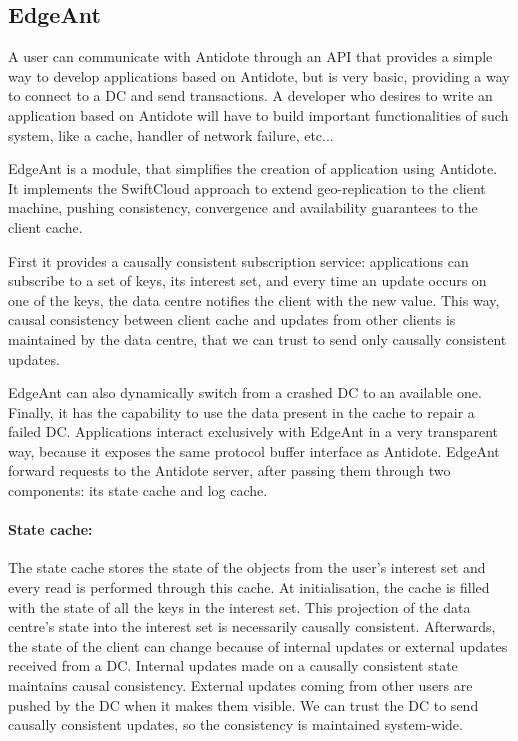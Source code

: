 \documentclass[11pt]{article}
\begin{document}
\subsection{EdgeAnt}

A user can communicate with Antidote through an API that provides a simple way
to develop applications based on Antidote, but is very basic, providing a way
to connect to a DC and send transactions. A developer who desires to write an
application based on Antidote will have to build important functionalities of
such system, like a cache, handler of network failure, etc...

EdgeAnt is a module, that simplifies the creation of application using
Antidote. It implements the SwiftCloud approach \cite{Zawirski2015} to extend
geo-replication to the client machine, pushing consistency, convergence and
availability guarantees to the client cache.

First it provides a causally consistent subscription service: applications can
subscribe to a set of keys, its interest set, and every time an update occurs
on one of the keys, the data centre notifies the client with the new value.
This way, causal consistency between client cache and updates from other
clients is maintained by the data centre, that we can trust to send only
causally consistent updates.

EdgeAnt can also dynamically switch from a crashed DC to an available one.
Finally, it has the capability to use the data present in the cache to repair
a failed DC. Applications interact exclusively with EdgeAnt in a very
transparent way, because it exposes the same protocol buffer interface as
Antidote. EdgeAnt forward requests to the Antidote server, after passing them
through two components: its state cache and log cache.

\paragraph{State cache:}
The state cache stores the state of the objects from the user's interest set
and every read is performed through this cache. At initialisation, the cache
is filled with the state of all the keys in the interest set. This projection
of the data centre's state into the interest set is necessarily causally
consistent. Afterwards, the state of the client can change because of internal
updates or external updates received from a DC. Internal updates made on a
causally consistent state maintains causal consistency. External updates
coming from other users are pushed by the DC when it makes them visible. We
can trust the DC to send causally consistent updates, so the consistency is
maintained system-wide.
\end{document}
